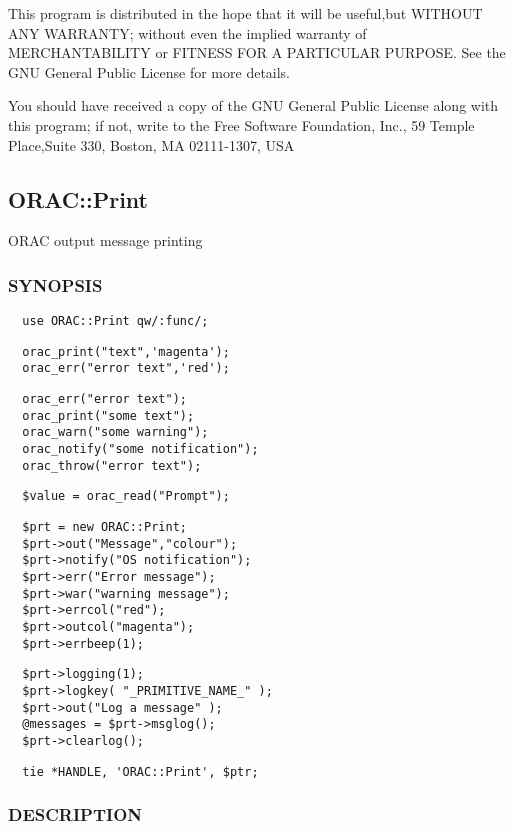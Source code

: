 \begin{description}
\begin{description}
This program is distributed in the hope that it will be useful,but WITHOUT ANY
WARRANTY; without even the implied warranty of MERCHANTABILITY or FITNESS FOR A
PARTICULAR PURPOSE. See the GNU General Public License for more details.



You should have received a copy of the GNU General Public License along with
this program; if not, write to the Free Software Foundation, Inc., 59 Temple
Place,Suite 330, Boston, MA  02111-1307, USA

\subsection{ORAC::Print\label{ORAC::Print}}


ORAC output message printing

\subsubsection*{SYNOPSIS\label{ORAC::Print_SYNOPSIS}}
\begin{verbatim}
  use ORAC::Print qw/:func/;
\end{verbatim}
\begin{verbatim}
  orac_print("text",'magenta');
  orac_err("error text",'red');
\end{verbatim}
\begin{verbatim}
  orac_err("error text");
  orac_print("some text");
  orac_warn("some warning");
  orac_notify("some notification");
  orac_throw("error text");
\end{verbatim}
\begin{verbatim}
  $value = orac_read("Prompt");
\end{verbatim}
\begin{verbatim}
  $prt = new ORAC::Print;
  $prt->out("Message","colour");
  $prt->notify("OS notification");
  $prt->err("Error message");
  $prt->war("warning message");
  $prt->errcol("red");
  $prt->outcol("magenta");
  $prt->errbeep(1);
\end{verbatim}
\begin{verbatim}
  $prt->logging(1);
  $prt->logkey( "_PRIMITIVE_NAME_" );
  $prt->out("Log a message" );
  @messages = $prt->msglog();
  $prt->clearlog();
\end{verbatim}
\begin{verbatim}
  tie *HANDLE, 'ORAC::Print', $ptr;
\end{verbatim}
\subsubsection*{DESCRIPTION\label{ORAC::Print_DESCRIPTION}}



\end{description}
\end{description}
